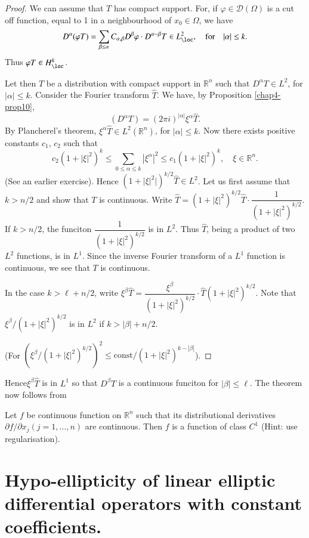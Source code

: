 \begin{proof}
We can assume that $T$ has compact support. For, if $\varphi\in \mathcal{D}(\Omega)$ is a cut off function, equal to 1 in a neighbourhood of $x_{0}\in \Omega$, we have
$$
D^{\alpha}(\varphi T)=\sum\limits_{\beta\leq \alpha}C_{\alpha,\beta}D^{\beta}\varphi\cdot D^{\alpha-\beta}T\in L^{2}_{\loc},\quad\text{for}\quad |\alpha|\leq k.
$$
Thus $\varphi T\in H^{k}_{\loc}$.

Let then $T$ be a distribution with compact support in $\mathbb{R}^{n}$ such that $D^{\alpha}T\in L^{2}$, for $|\alpha|\leq k$. Consider the Fourier transform $\widehat{T}$. We have, by Proposition \ref{chap4-prop10},
$$
(D^{\alpha}T)=(2\pi i)^{|\alpha|}\xi^{\alpha}\widehat{T}.
$$
By Plancherel's theorem, $\xi^{\alpha}\widehat{T}\in L^{2}(\mathbb{R}^{n})$, for $|\alpha|\leq k$. Now there exists positive constants $c_{1}$, $c_{2}$ such that
$$
c_{2}(1+|\xi|^{2})^{k}\leq \sum\limits_{0\leq \alpha\leq k}|\xi^{\alpha}|^{2}\leq c_{1}(1+|\xi|^{2})^{k},\quad \xi\in \mathbb{R}^{n}.
$$
(See an earlier exercise). Hence $(1+|\xi|^{2}|)^{k/2}\widehat{T}\in L^{2}$. Let us first assume that $k>n/2$ and show that $T$ is continuous. Write $\widehat{T}=(1+|\xi|^{2})^{k/2}\widehat{T}\cdot \dfrac{1}{(1+|\xi|^{2})^{k/2}}$. If $k>n/2$, the funciton $\dfrac{1}{(1+|\xi|^{2})^{k/2}}$ is in $L^{2}$. Thus $\widehat{T}$, being a product of two $L^{2}$ functions, is in $L^{1}$. Since the inverse Fourier transform of a $L^{1}$ function is continuous, we see that $T$ is continuous.

In the case $k>\ell +n/2$, write $\xi^{\beta}\widehat{T}=\dfrac{\xi^{\beta}}{(1+|\xi|^{2})^{k/2}}\cdot \widehat{T}(1+|\xi|^{2})^{k/2}$. Note that $\xi^{\beta}/(1+|\xi|^{2})^{k/2}$ is in $L^{2}$ if $k>|\beta|+n/2$.

(For $(\xi^{\beta}/(1+|\xi|^{2})^{k/2})^{2}\leq \text{const}/(1+|\xi|^{2})^{k-|\beta|}$).
\end{proof}

Hence\pageoriginale $\xi^{\beta}\widehat{T}$ is in $L^{1}$ so that $D^{\beta} T$ is a continuous funciton for $|\beta|\leq \ell$. The theorem now follows from

\begin{exer*}
Let $f$ be continuous function on $\mathbb{R}^{n}$ such that its distributional derivatives $\partial f/\partial x_{j}(j=1,\ldots,n)$ are continuous. Then $f$ is a function of class $C^{1}$ (Hint: use regularisation).
\end{exer*}

\section*{Hypo-ellipticity of linear elliptic differential operators with constant coefficients.}

